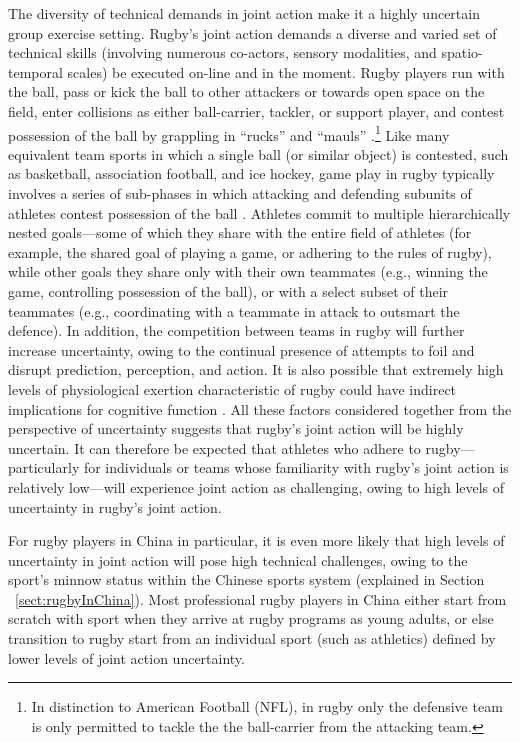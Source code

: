 \begin{CJK}{UTF8}{gbsn}
The diversity of technical demands in joint action make it a highly uncertain group exercise setting.  Rugby’s joint action demands a diverse and varied set of technical skills (involving numerous co-actors, sensory modalities, and spatio-temporal scales) be executed on-line and in the moment.  Rugby players run with the ball, pass or kick the ball to other attackers or towards open space on the field, enter collisions as either ball-carrier, tackler, or support player, and contest possession of the ball by grappling in ``rucks'' and ``mauls'' \citep{Ross2015a}.\footnote{In distinction to American Football (NFL), in rugby only the defensive team is only permitted to tackle the the ball-carrier from the attacking team.}  Like many equivalent team sports in which a single ball (or similar object) is contested, such as basketball, association football, and ice hockey, game play in rugby typically involves a series of sub-phases in which attacking and defending subunits of athletes contest possession of the ball \citep{Passos2011}.  Athletes commit to multiple hierarchically nested goals---some of which they share with the entire field of athletes (for example, the shared goal of playing a game, or adhering to the rules of rugby), while other goals they share only with their own teammates (e.g., winning the game, controlling possession of the ball), or with a select subset of their teammates (e.g., coordinating with a teammate in attack to outsmart the defence).  In addition, the competition between teams in rugby will further increase uncertainty, owing to the continual presence of attempts to foil and disrupt prediction, perception, and action. It is also possible that extremely high levels of physiological exertion characteristic of rugby could have indirect implications for cognitive function \citep{Dietrich2004a}.  All these factors considered together from the perspective of uncertainty suggests that rugby's joint action will be highly uncertain.  It can therefore be expected that athletes who adhere to rugby---particularly for individuals or teams whose familiarity with rugby’s joint action is relatively low---will experience joint action as challenging, owing to high levels of uncertainty in rugby's joint action.

For rugby players in China in particular, it is even more likely that high levels of uncertainty in joint action will pose high technical challenges, owing to the sport's minnow status within the Chinese sports system (explained in Section ~\ref{sect:rugbyInChina}).  Most professional rugby players in China either start from scratch with sport when they arrive at rugby programs as young adults, or else transition to rugby start from an individual sport (such as athletics) defined by lower levels of joint action uncertainty.



\end{CJK}

